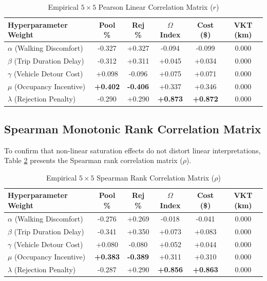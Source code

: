 \documentclass[11pt,a4paper]{article}
\begin{document}
\begin{table}[htbp]
\centering
\caption{Empirical $5 \times 5$ Pearson Linear Correlation Matrix ($r$)}
\label{tab:pearson}
\vspace{0.5em}
\begin{tabular}{l c c c c c}
\hline\hline
\textbf{Hyperparameter Weight} & \textbf{Pool \%} & \textbf{Rej \%} & \textbf{$\Omega$ Index} & \textbf{Cost (\$)} & \textbf{VKT (km)} \\
\hline
$\alpha$ (Walking Discomfort)   & -0.327 & +0.327 & -0.094 & -0.099 & 0.000 \\
$\beta$ (Trip Duration Delay)   & -0.312 & +0.311 & +0.045 & +0.034 & 0.000 \\
$\gamma$ (Vehicle Detour Cost)  & +0.098 & -0.096 & +0.075 & +0.071 & 0.000 \\
$\mu$ (Occupancy Incentive)     & \textbf{+0.402} & \textbf{-0.406} & +0.337 & +0.346 & 0.000 \\
$\lambda$ (Rejection Penalty)   & -0.290 & +0.290 & \textbf{+0.873} & \textbf{+0.872} & 0.000 \\
\hline\hline
\end{tabular}
\end{table}

\subsection{Spearman Monotonic Rank Correlation Matrix}
To confirm that non-linear saturation effects do not distort linear interpretations, Table \ref{tab:spearman} presents the Spearman rank correlation matrix ($\rho$).

\begin{table}[htbp]
\centering
\caption{Empirical $5 \times 5$ Spearman Rank Correlation Matrix ($\rho$)}
\label{tab:spearman}
\vspace{0.5em}
\begin{tabular}{l c c c c c}
\hline\hline
\textbf{Hyperparameter Weight} & \textbf{Pool \%} & \textbf{Rej \%} & \textbf{$\Omega$ Index} & \textbf{Cost (\$)} & \textbf{VKT (km)} \\
\hline
$\alpha$ (Walking Discomfort)   & -0.276 & +0.269 & -0.018 & -0.041 & 0.000 \\
$\beta$ (Trip Duration Delay)   & -0.341 & +0.350 & +0.073 & +0.083 & 0.000 \\
$\gamma$ (Vehicle Detour Cost)  & +0.080 & -0.080 & +0.052 & +0.044 & 0.000 \\
$\mu$ (Occupancy Incentive)     & \textbf{+0.383} & \textbf{-0.389} & +0.311 & +0.310 & 0.000 \\
$\lambda$ (Rejection Penalty)   & -0.287 & +0.290 & \textbf{+0.856} & \textbf{+0.863} & 0.000 \\
\hline\hline
\end{tabular}
\end{table}
\end{document}
